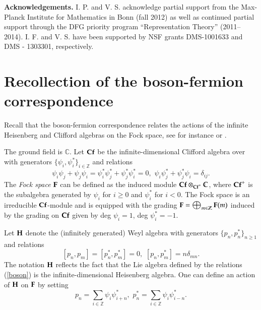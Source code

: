 \documentclass[11pt]{amsart}
\begin{document}
{\bf Acknowledgements.} I. P. and V. S. acknowledge partial support from the Max-Planck Institute for Mathematics in Bonn (fall 2012) as well as continued 
partial support through the DFG priority program ``Representation Theory'' (2011--2014).  I. F. and V. S. have been supported by NSF grants  DMS-1001633
and DMS - 1303301, respectively.

\section {Recollection of the boson-fermion correspondence}

Recall that the
boson-fermion correspondence relates the actions of the
infinite Heisenberg and Clifford algebras on the Fock space, see for instance \cite{F}
or \cite{DJKM}. 

The ground field is $\mathbb C$.
Let $\bold{Cf}$ be the infinite-dimensional Clifford algebra over
with generators
$\{\psi_i,\psi^*_i\}_{i\in\mathbb Z}$ and relations 
\begin{equation}\label{clifford}
\psi_i\psi_j+\psi_j\psi_i=\psi^*_i\psi^*_j+\psi^*_j\psi^*_i=0,\,\,\psi_i\psi^*_j+\psi^*_j\psi_i=\delta_{ij}.
\end{equation}
The {\it Fock space} $\bold{F}$ can be defined as the induced module
$\bold{Cf}\otimes_{\bold{Cf}^+}\mathbb C$, where $\bold{Cf}^+$ is the subalgebra generated
by $\psi_i$ for $i\geq 0$ and $\psi^*_i$ for $i<0$. The Fock space  is an
irreducible $\bold{Cf}$-module and is equipped with the grading
$\bold{F}=\bigoplus_{m\in\mathbb Z}\bold{F}(m)$ induced by the grading on
$\bold{Cf}$ given by deg $\psi_i=1$, deg $\psi_i^*=-1$.

Let $\bold {H}$ denote the (infinitely generated) Weyl algebra
with generators $\{p_n,p^*_n\}_{n\geq 1}$ and relations
\begin{equation}\label{boson}
[p_n,p_m]=[p_n^*,p_m^*]=0,\,\,[p_n,p^*_m]=n\delta_{mn}.
\end{equation}
The notation $\bold {H}$ reflects the fact that the Lie algebra defined by the relations (\ref{boson}) is the infinite-dimensional
Heisenberg algebra.
One can define an action of  $\bold {H}$ on $\bold{F}$ by setting 
$$p_n=\sum_{i\in \mathbb Z}\psi_i\psi^*_{i+n},\,\,p^*_n=\sum_{i\in \mathbb Z}\psi_i\psi^*_{i-n}.$$
\end{document}
